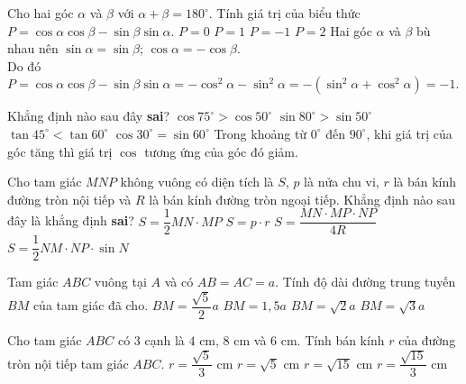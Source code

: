 \begin{ex}
	Cho hai góc $\alpha$ và $\beta$ với $\alpha+\beta =180^\circ$. Tính giá trị của biểu thức $P=\cos\alpha\cos\beta -\sin\beta\sin\alpha$.
	\choice
	{$P=0$}
	{$P=1$}
	{\True $P=-1$}
	{$P=2$}
	\loigiai
	{Hai góc $\alpha$ và $\beta$ bù nhau nên $\sin\alpha =\sin\beta$; $\cos\alpha =-\cos\beta$.\\
	Do đó $P=\cos\alpha\cos\beta -\sin\beta\sin\alpha =-\cos^2\alpha -\sin^2\alpha =-(\sin^2\alpha +\cos^2\alpha)=-1$.}
\end{ex}
\begin{ex}
	Khẳng định nào sau đây \textbf{sai}?
	\choice
	{\True $\cos 75^\circ >\cos 50^\circ $}
	{$\sin 80^\circ >\sin 50^\circ $}
	{$\tan 45^\circ <\tan 60^\circ $}
	{$\cos 30^\circ =\sin 60^\circ $}
	\loigiai
	{Trong khoảng từ $0^\circ$ đến $90^\circ$, khi giá trị của góc tăng thì giá trị $\cos$ tương ứng của góc đó giảm.}
\end{ex}
\begin{ex}
	Cho tam giác $MNP$ không vuông có diện tích là $S$, $p$ là nửa chu vi, $r$ là bán kính đường tròn nội tiếp và $R$ là bán kính đường tròn ngoại tiếp. Khẳng định nào sau đây là khẳng định \textbf{sai}?
	\choice
	{\True $S=\dfrac{1}{2}MN\cdot MP$}
	{$S=p\cdot r$}
	{$S=\dfrac{MN\cdot MP\cdot NP}{4R}$}
	{$S=\dfrac{1}{2}NM\cdot NP\cdot\sin{N}$}
\end{ex}
\begin{ex}
	Tam giác $ABC$ vuông tại $A$ và có $AB=AC=a$. Tính độ dài đường trung tuyến $BM$ của tam giác đã cho.
	\choice
	{\True $BM=\dfrac{\sqrt{5}}{2}a$}
	{$BM=1{,}5a$}
	{$BM=\sqrt{2}a$}
	{$BM=\sqrt{3}a$}
\end{ex}
\begin{ex}
	Cho tam giác $ABC$ có $3$ cạnh là $4$ cm, $8$ cm và $6$ cm. Tính bán kính $r$ của đường tròn nội tiếp tam giác $ABC$.
	\choice
	{$r=\dfrac{\sqrt{5}}{3}$ cm}
	{$r=\sqrt{5}$ cm}
	{$r=\sqrt{15}$ cm}
	{\True $r=\dfrac{\sqrt{15}}{3}$ cm}
\end{ex}
